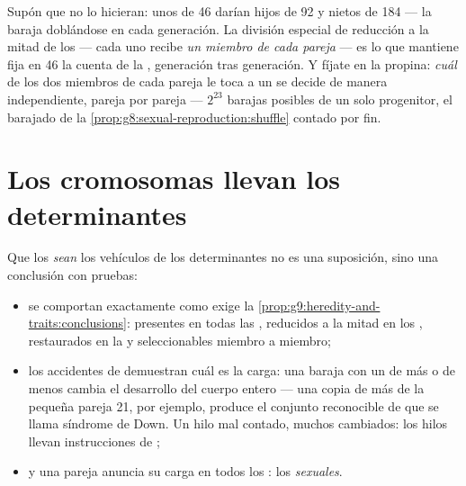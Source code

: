 \begin{remark}\label{rem:g9:chromosomes:whyhalve}
Supón que no lo hicieran: unos  de 46  darían hijos de
92 y nietos de 184 --- la baraja doblándose en cada generación. La
división especial de reducción a la mitad de los  --- cada uno
recibe \emph{un miembro de cada pareja} --- es lo que mantiene fija en
46 la cuenta de la , generación tras generación. Y fíjate en la
propina: \emph{cuál} de los dos miembros de cada pareja le toca a un
 se decide de manera independiente, pareja por pareja ---
$2^{23}$ barajas posibles de un solo progenitor, el barajado de la
\cref{prop:g8:sexual-reproduction:shuffle} contado por fin.
\end{remark}

\section{Los cromosomas llevan los determinantes}

\begin{proposition}\label{prop:g9:chromosomes:evidence}
Que los  \emph{sean} los vehículos de los determinantes no es
una suposición, sino una conclusión con pruebas:
\begin{itemize}
  \item se comportan exactamente como exige la
        \cref{prop:g9:heredity-and-traits:conclusions}: presentes en
        todas las , reducidos a la mitad en los ,
        restaurados en la  y seleccionables miembro a
        miembro;
  \item los accidentes de  demuestran cuál es la carga: una
        baraja con un  de más o de menos cambia el desarrollo
        del cuerpo entero --- una copia de más de la pequeña pareja 21,
        por ejemplo, produce el conjunto reconocible de  que se
        llama síndrome de Down. Un hilo mal contado, muchos 
        cambiados: los hilos llevan instrucciones de ;
  \item y una pareja anuncia su carga en todos los : los
        \emph{ sexuales}.
\end{itemize}
\end{proposition}
\admitted

